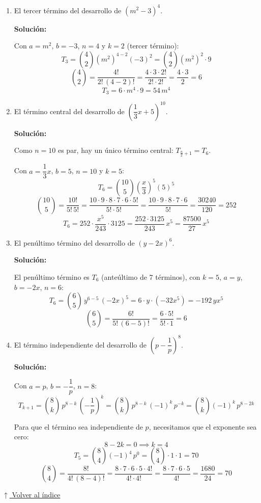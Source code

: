 \documentclass[12pt]{article}
\newcommand{\solucion}{%
    \vspace{0.8em}%
    \textbf{Solución:}%
}
\newcommand{\volverindice}{%
    \vspace{1em}%
    \begin{flushright}%
        \hyperlink{indice}{\small $\uparrow$ Volver al índice}%
    \end{flushright}%
}
\begin{document}
\begin{enumerate}[label=\alph*.-]
    \item El tercer término del desarrollo de $(m^2-3)^4$.

    \solucion

    Con $a=m^2$, $b=-3$, $n=4$ y $k=2$ (tercer término):
    \[
    T_3 = \binom{4}{2}(m^2)^{4-2}(-3)^2
    = \binom{4}{2}(m^2)^2\cdot9
    \]
    \[
    \binom{4}{2} = \frac{4!}{2!\,(4-2)!} = \frac{4\cdot3\cdot2!}{2!\cdot2!} = \frac{4\cdot3}{2} = 6
    \]
    \[
    T_3 = 6\cdot m^4\cdot9 = 54\,m^4
    \]

    \item El término central del desarrollo de $\left(\dfrac{1}{3}x+5\right)^{10}$.

    \solucion

    Como $n=10$ es par, hay un único término central: $T_{\frac{n}{2}+1} = T_6$.

    Con $a=\dfrac{1}{3}x$, $b=5$, $n=10$ y $k=5$:
    \[
    T_6 = \binom{10}{5}\left(\frac{x}{3}\right)^5(5)^5
    \]
    \[
    \binom{10}{5} = \frac{10!}{5!\,5!} = \frac{10\cdot9\cdot8\cdot7\cdot6\cdot5!}{5!\cdot5!}
    = \frac{10\cdot9\cdot8\cdot7\cdot6}{5!} = \frac{30240}{120} = 252
    \]
    \[
    T_6 = 252\cdot\frac{x^5}{243}\cdot3125
    = \frac{252\cdot3125}{243}\,x^5
    = \frac{87500}{27}\,x^5
    \]

    \item El penúltimo término del desarrollo de $(y-2x)^6$.

    \solucion

    El penúltimo término es $T_6$ (anteúltimo de 7 términos), con $k=5$,
    $a=y$, $b=-2x$, $n=6$:
    \[
    T_6 = \binom{6}{5}\,y^{6-5}\,(-2x)^5
    = 6\cdot y\cdot(-32x^5)
    = -192\,yx^5
    \]
    \[
    \binom{6}{5} = \frac{6!}{5!\,(6-5)!} = \frac{6\cdot5!}{5!\cdot1} = 6
    \]

    \newpage
    \item El término independiente del desarrollo de $\left(p-\dfrac{1}{p}\right)^8$.

    \solucion

    Con $a=p$, $b=-\dfrac{1}{p}$, $n=8$:
    \[
    T_{k+1} = \binom{8}{k}\,p^{8-k}\,\left(-\frac{1}{p}\right)^k
    = \binom{8}{k}\,p^{8-k}\,(-1)^k\,p^{-k}
    = \binom{8}{k}(-1)^k\,p^{8-2k}
    \]

    Para que el término sea independiente de $p$, necesitamos que el exponente sea cero:
    \[
    8-2k = 0 \implies k = 4
    \]
    \[
    T_5 = \binom{8}{4}(-1)^4\,p^0
    = \binom{8}{4}\cdot1\cdot1 = 70
    \]
    \[
    \binom{8}{4} = \frac{8!}{4!\,(8-4)!} = \frac{8\cdot7\cdot6\cdot5\cdot4!}{4!\cdot4!}
    = \frac{8\cdot7\cdot6\cdot5}{4!} = \frac{1680}{24} = 70
    \]

\end{enumerate}

\volverindice
\end{document}
